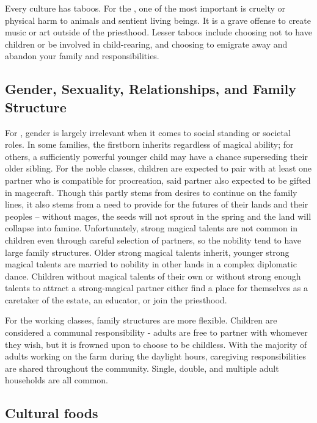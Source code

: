 \documentclass[blue]{GL2020}
\begin{document}
Every culture has taboos. For the \pFarmers{}, one of the most important is cruelty or physical harm to animals and sentient living beings. It is a grave offense to create music or art outside of the priesthood. Lesser taboos include choosing not to have children or be involved in child-rearing, and choosing to emigrate away and abandon your family and responsibilities.


\subsection*{Gender, Sexuality, Relationships, and Family Structure}

For \pFarm{}, gender is largely irrelevant when it comes to social standing or societal roles. In some families, the firstborn inherits regardless of magical ability; for others, a sufficiently powerful younger child may have a chance superseding their older sibling. For the noble classes, children are expected to pair with at least one partner who is compatible for procreation, said partner also expected to be gifted in magecraft. Though this partly stems from desires to continue on the family lines, it also stems from a need to provide for the futures of their lands and their peoples -- without mages, the seeds will not sprout in the spring and the land will collapse into famine. Unfortunately, strong magical talents are not common in children even through careful selection of partners, so the nobility tend to have large family structures.  Older strong magical talents inherit, younger strong magical talents are married to nobility in other lands in a complex diplomatic dance. Children without magical talents of their own or without strong enough talents to attract a strong-magical partner either find a place for themselves as a caretaker of the estate, an educator, or join the priesthood.

For the working classes, family structures are more flexible.  Children are considered a communal responsibility - adults are free to partner with whomever they wish, but it is frowned upon to choose to be childless.  With the majority of adults working on the farm during the daylight hours, caregiving responsibilities are shared throughout the community.  Single, double, and multiple adult households are all common.       
 
\subsection*{Cultural foods}
\end{document}
